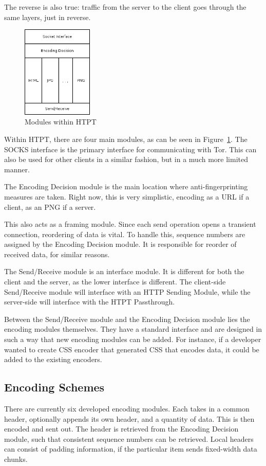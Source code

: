 The reverse is also true: traffic from the server to the client goes through the same layers, just in reverse. 

\begin{figure}[b]
\centering
\includegraphics[width=0.3\textwidth]{htpt_architecture}
\caption{Modules within HTPT}
\label{fig:htpt_modules}
\end{figure}

Within HTPT, there are four main modules, as can be seen in Figure~\ref{fig:htpt_modules}. The SOCKS interface is the primary interface for communicating with Tor. This can also be used for other clients in a similar fashion, but in a much more limited manner.

The Encoding Decision module is the main location where anti-fingerprinting measures are taken. Right now, this is very simplistic, encoding as a URL if a client, as an PNG if a server. 

This also acts as a framing module. Since each send operation opens a transient connection, reordering of data is vital. To handle this, sequence numbers are assigned by the Encoding Decision module. It is responsible for reorder of received data, for similar reasons. 

The Send/Receive module is an interface module. It is different for both the client and the server, as the lower interface is different. The client-side Send/Receive module will interface with an HTTP Sending Module, while the server-side will interface with the HTPT Passthrough.

Between the Send/Receive module and the Encoding Decision module lies the encoding modules themselves. They have a standard interface and are designed in such a way that new encoding modules can be added. For instance, if a developer wanted to create CSS encoder that generated CSS that encodes data, it could be added to the existing encoders.

\subsection{Encoding Schemes}
There are currently six developed encoding modules. Each takes in a common header, optionally appends its own header, and a quantity of data. This is then encoded and sent out. The header is retrieved from the Encoding Decision module, such that consistent sequence numbers can be retrieved. Local headers can consist of padding information, if the particular item sends fixed-width data chunks. 

